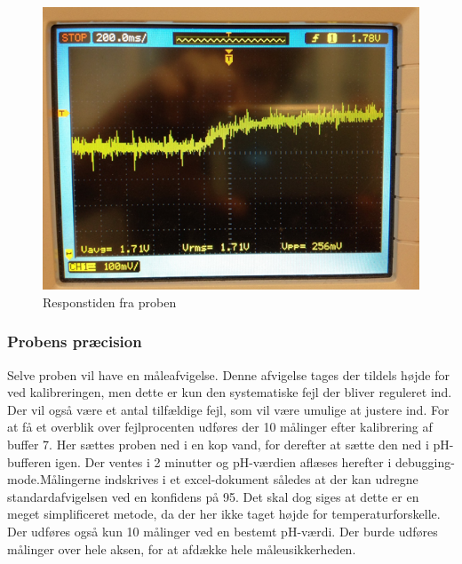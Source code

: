  \begin{figure}[H]
	\centering 
	\includegraphics[scale=0.8]{HardwareArkitektur/Sensore/pH_probe_billeder/respons.png}
	\caption{Responstiden fra proben}
	\label{photo:respons}
\end{figure} 

\subsubsection{Probens præcision}
Selve proben vil have en måleafvigelse. Denne afvigelse tages der tildels højde for ved kalibreringen, men dette er kun den systematiske fejl der bliver reguleret ind. Der vil også være et antal tilfældige fejl, som vil være umulige at justere ind. For at få et overblik over fejlprocenten udføres der 10 målinger efter kalibrering af buffer 7. Her sættes proben ned i en kop vand, for derefter at sætte den ned i pH-bufferen igen. Der ventes i 2 minutter og pH-værdien aflæses herefter i debugging-mode.\newline Målingerne indskrives i et excel-dokument således at der kan udregne standardafvigelsen ved en konfidens på 95. Det skal dog siges at dette er en meget simplificeret metode, da der her ikke taget højde for temperaturforskelle. Der udføres også kun 10 målinger ved en bestemt pH-værdi. Der burde udføres målinger over hele aksen, for at afdække hele måleusikkerheden.    

